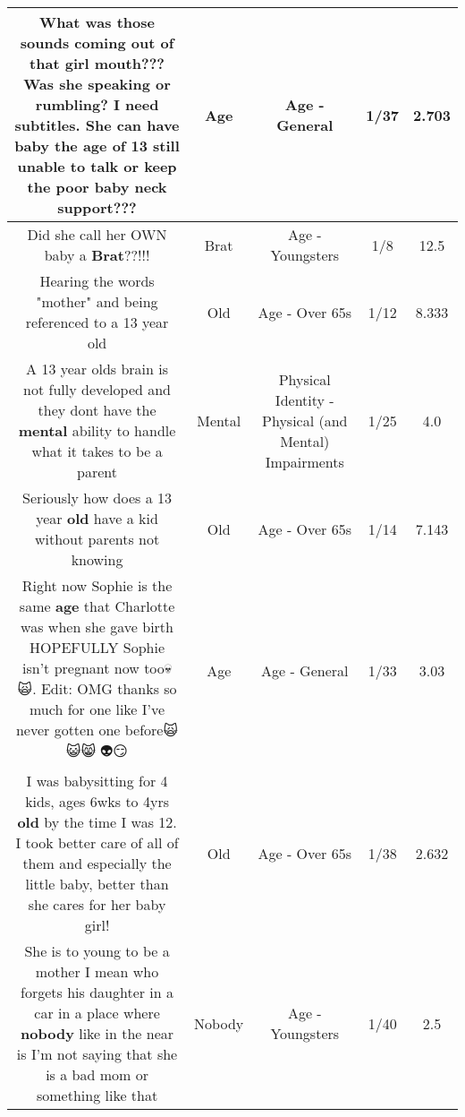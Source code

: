 \documentclass[11pt]{article}
\newlength\mylength
\begin{document}
\begin{center}
\begin{longtable}{|C{.65\mylength}|C{.30\mylength}|C{.12\mylength}|C{.12\mylength}|C{.12\mylength}|}
  \small What was those sounds coming out of that girl mouth??? Was she speaking or rumbling? I need subtitles. She can have baby the \textbf{age} of 13 still unable to talk or keep the poor baby neck support???\normalsize   & Age & Age - General & 1/37 & 2.703 \\  \hline
  \small Did she call her OWN baby a \textbf{Brat}??!!!\normalsize   & Brat & Age - Youngsters & 1/8 & 12.5 \\  \hline
  \small Hearing the words "mother" and being referenced to a 13 year old\normalsize   & Old & Age - Over 65s & 1/12 & 8.333 \\  \hline
  \small A 13 year olds brain is not fully developed and they dont have the \textbf{mental} ability to handle what it takes to be a parent\normalsize   & Mental & Physical Identity - Physical (and Mental) Impairments & 1/25 & 4.0 \\  \hline
  \small Seriously how does a 13 year \textbf{old} have a kid without parents not knowing\normalsize   & Old & Age - Over 65s & 1/14 & 7.143 \\  \hline
  \small Right now Sophie is the same \textbf{age} that Charlotte was when she gave birth HOPEFULLY Sophie isn't pregnant now too💀🙀. Edit:   OMG thanks so much for one like I've never gotten one before🙀😺😸👻👽😏\normalsize   & Age & Age - General & 1/33 & 3.03 \\  \hline
  \small I was babysitting for 4 kids, ages 6wks to 4yrs \textbf{old} by the time I was 12.  I took better care of all of them and especially the little baby, better than she cares for her baby girl!\normalsize   & Old & Age - Over 65s & 1/38 & 2.632 \\  \hline
  \small She is to young to be a mother I mean who forgets his daughter in a car in a place where \textbf{nobody} like in the near is I'm not saying that she is a bad mom or something like that\normalsize   & Nobody & Age - Youngsters & 1/40 & 2.5 \\  \hline

\end{longtable}
\end{center}
\end{document}
